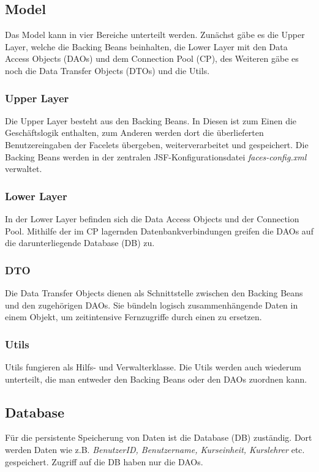    	\subsection{Model}
   	Das Model kann in vier Bereiche unterteilt werden. Zunächst gäbe es die \glqq Upper Layer\grqq{}, welche die Backing Beans beinhalten, die \glqq Lower Layer\grqq{} mit den Data Access Objects (DAOs) und dem Connection Pool (CP), des Weiteren gäbe es noch die Data Transfer Objects (DTOs) und die Utils. 
   		\subsubsection{Upper Layer}
   		Die \glqq Upper Layer\grqq{} besteht aus den Backing Beans. In Diesen ist zum Einen die Geschäftslogik enthalten, zum Anderen werden dort die überlieferten Benutzereingaben der Facelets übergeben, weiterverarbeitet und gespeichert. Die Backing Beans werden in der zentralen JSF-Konfigurationsdatei \textit{faces-config.xml} verwaltet.
    	\subsubsection{Lower Layer}
    	In der \glqq Lower Layer\grqq{} befinden sich die Data Access Objects und der Connection Pool. Mithilfe der im CP lagernden Datenbankverbindungen greifen die DAOs auf die darunterliegende Database (DB) zu.
    	\subsubsection{DTO}
    	Die Data Transfer Objects dienen als Schnittstelle zwischen den Backing Beans und den zugehörigen DAOs. Sie bündeln logisch zusammenhängende Daten in einem Objekt, um zeitintensive Fernzugriffe durch einen zu ersetzen.
    	\subsubsection{Utils}
    	Utils fungieren als Hilfs- und Verwalterklasse. Die Utils werden auch wiederum unterteilt, die man entweder den Backing Beans oder den DAOs zuordnen kann. 
    \subsection{Database}
    Für die persistente Speicherung von Daten ist die Database (DB) zuständig. Dort werden Daten wie z.B. \textit{BenutzerID, Benutzername, Kurseinheit, Kurslehrer} etc. gespeichert. Zugriff auf die DB haben nur die DAOs. 

